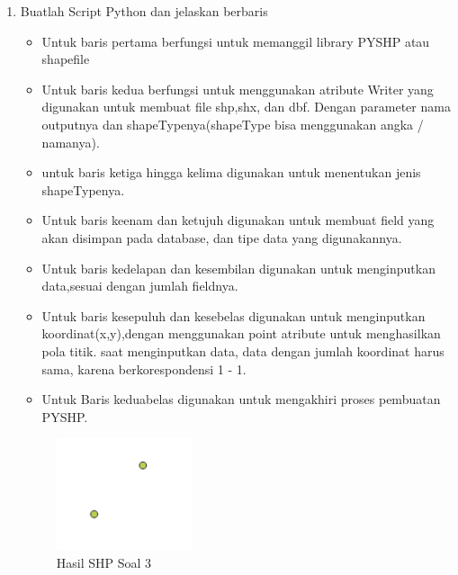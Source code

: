 \begin{enumerate}
	\item Buatlah Script Python dan jelaskan berbaris
	
	\begin{itemize}
		\item Untuk baris pertama berfungsi untuk memanggil library PYSHP atau shapefile
		\item Untuk baris kedua berfungsi untuk menggunakan atribute Writer yang digunakan untuk membuat file shp,shx, dan dbf. \hfill\break Dengan parameter nama outputnya dan shapeTypenya(shapeType bisa menggunakan angka / namanya).
		\item untuk baris ketiga hingga kelima digunakan untuk menentukan jenis shapeTypenya.
		\item Untuk baris keenam dan ketujuh digunakan untuk membuat field yang akan disimpan pada database, dan tipe data yang digunakannya.
		\item Untuk baris kedelapan dan kesembilan digunakan untuk menginputkan data,sesuai dengan jumlah fieldnya.
		\item Untuk baris kesepuluh dan kesebelas digunakan untuk menginputkan koordinat(x,y),dengan menggunakan point atribute untuk menghasilkan pola titik. \hfill\break
		saat menginputkan data, data dengan jumlah koordinat harus sama, karena berkorespondensi 1 - 1.
		\item Untuk Baris keduabelas digunakan untuk mengakhiri proses pembuatan PYSHP.
	\end{itemize}
	\hfill\break
	\begin{figure}[H]
		\includegraphics[width=4cm]{figures/1174004/2/3.png}
		\centering
		\caption{Hasil SHP Soal 3}
	\end{figure}


\end{enumerate}
